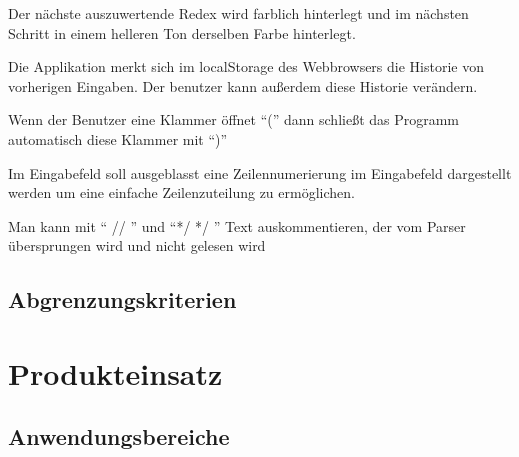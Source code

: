 \documentclass[parskip=full,11pt,twoside]{scrartcl}
\begin{document}


Der nächste auszuwertende Redex wird farblich hinterlegt und im nächsten Schritt in einem helleren Ton derselben Farbe hinterlegt.


Die Applikation merkt sich im localStorage des Webbrowsers die Historie von vorherigen Eingaben. Der benutzer kann außerdem diese Historie verändern.



Wenn der Benutzer eine Klammer öffnet \enquote{(} dann schließt das Programm automatisch diese Klammer mit \enquote{)}

Im Eingabefeld soll ausgeblasst eine Zeilennumerierung im Eingabefeld dargestellt werden um eine einfache Zeilenzuteilung zu ermöglichen.

Man kann mit \enquote{ // } und \enquote{*/ */ }  Text auskommentieren, der vom Parser übersprungen wird und nicht gelesen wird

\subsection{Abgrenzungskriterien}


\pagebreak
\section{Produkteinsatz}
\subsection{Anwendungsbereiche}
\end{document}
